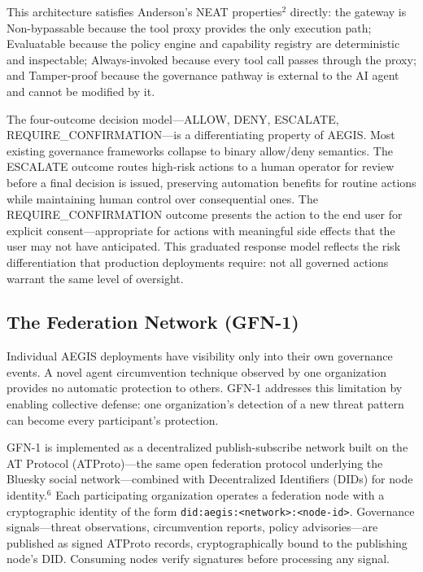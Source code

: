 \documentclass{IEEEcsmag}
\begin{document}
\begin{table}[!t]
\centering
\caption{Mapping of Anderson's NEAT reference monitor properties to AEGIS architectural components.}
\label{tab:neat}
\end{table}

This architecture satisfies Anderson's NEAT properties$^{2}$ directly: the gateway is Non-bypassable because the tool proxy provides the only execution path; Evaluatable because the policy engine and capability registry are deterministic and inspectable; Always-invoked because every tool call passes through the proxy; and Tamper-proof because the governance pathway is external to the AI agent and cannot be modified by it.

The four-outcome decision model---ALLOW, DENY, ESCALATE, REQUIRE\_CONFIRMATION---is a differentiating property of AEGIS. Most existing governance frameworks collapse to binary allow/deny semantics. The ESCALATE outcome routes high-risk actions to a human operator for review before a final decision is issued, preserving automation benefits for routine actions while maintaining human control over consequential ones. The REQUIRE\_CONFIRMATION outcome presents the action to the end user for explicit consent---appropriate for actions with meaningful side effects that the user may not have anticipated. This graduated response model reflects the risk differentiation that production deployments require: not all governed actions warrant the same level of oversight.

\subsection{The Federation Network (GFN-1)}

Individual AEGIS deployments have visibility only into their own governance events. A novel agent circumvention technique observed by one organization provides no automatic protection to others. GFN-1 addresses this limitation by enabling collective defense: one organization's detection of a new threat pattern can become every participant's protection.

GFN-1 is implemented as a decentralized publish-subscribe network built on the AT Protocol (ATProto)---the same open federation protocol underlying the Bluesky social network---combined with Decentralized Identifiers (DIDs) for node identity.$^{6}$ Each participating organization operates a federation node with a cryptographic identity of the form \texttt{did:aegis:<network>:<node-id>}. Governance signals---threat observations, circumvention reports, policy advisories---are published as signed ATProto records, cryptographically bound to the publishing node's DID. Consuming nodes verify signatures before processing any signal.
\end{document}
